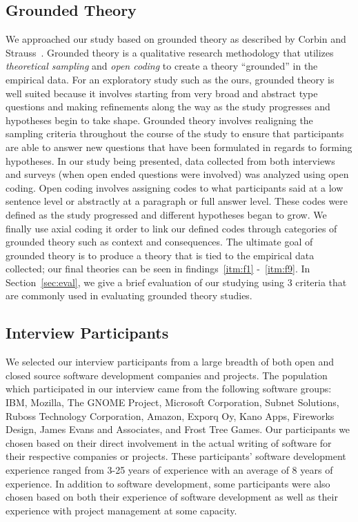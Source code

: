 \documentclass[conference]{IEEEtran}
\begin{document}
\subsection{Grounded Theory}
We approached our study based on grounded theory as described by Corbin and Strauss~\cite{Corbin:1998:SP}.
Grounded theory is a qualitative research methodology that utilizes \textit{theoretical sampling} and
\textit{open coding} to create a theory ``grounded'' in the empirical data. For an exploratory study such as
the ours, grounded theory is well suited because it involves starting from very broad and abstract type questions and
making refinements along the way as the study progresses and hypotheses begin to take shape. Grounded theory involves
realigning the sampling criteria throughout the course of the study to ensure that participants are able to answer new
questions that have been formulated in regards to forming hypotheses. In our study being presented, data collected from
both interviews and surveys (when open ended questions were involved) was analyzed using open coding. Open coding involves
assigning codes to what participants said at a low sentence level or abstractly at a paragraph or full answer level. These
codes were defined as the study progressed and different hypotheses began to grow. We finally use axial coding it order to
link our defined codes through categories of grounded theory such as context and consequences. The ultimate goal of grounded 
theory is to produce a theory that is tied to the empirical data collected; our final theories can be seen in
findings~\ref{itm:f1} -~\ref{itm:f9}. In Section~\ref{sec:eval}, we give a brief evaluation of our studying using 
3 criteria that are commonly used in evaluating grounded theory studies.

\subsection{Interview Participants}

We selected our interview participants from a large breadth of both open and closed source software development companies
and projects. The population which participated in our interview came from the following software groups: 
IBM, Mozilla, The GNOME Project, Microsoft Corporation, Subnet Solutions, Ruboss Technology Corporation, 
Amazon, Exporq Oy, Kano Apps, Fireworks Design, James Evans and Associates, and Frost Tree Games. 
Our participants we chosen based on their direct involvement in the actual writing of software for
their respective companies or projects. These participants' software development experience ranged from 3-25 years of experience
with an average of 8 years of experience.
In addition to software development, some participants were also chosen based on both their experience of software development 
as well as their experience with project management at some capacity.
\end{document}
